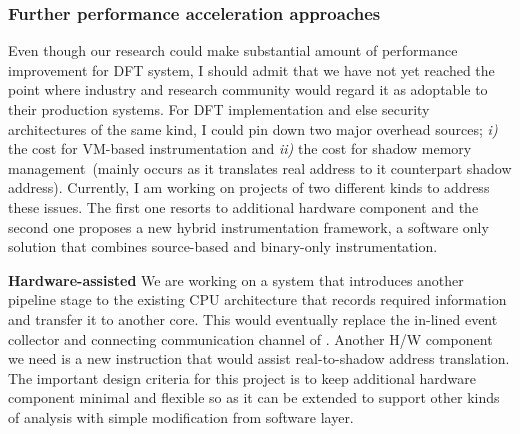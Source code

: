 \documentclass[letterpaper, 10pt]{article}
\begin{document}
\begin{small}
\subsubsection*{Further performance acceleration approaches}
%
Even though our research could make substantial amount of performance
improvement for DFT system, I should admit that we have not yet reached the
point where industry and research community would regard it as adoptable to
their production systems.
%
For DFT implementation and else security architectures of the same kind, I
could pin down two major overhead sources; {\it i)} the cost for VM-based
instrumentation and {\it ii)} the cost for shadow memory management~(mainly
occurs as it translates real address to it counterpart shadow address).
%
Currently, I am working on projects of two different kinds to address these
issues. The first one resorts to additional hardware component and the second
one proposes a new hybrid instrumentation framework, a software only solution
that combines source-based and binary-only instrumentation.

{\bf Hardware-assisted \SR} 
%
%
We are working on a system that introduces another pipeline stage to the
existing CPU architecture that records required information and transfer it to
another core. This would eventually replace the in-lined event collector and
connecting communication channel of \SR. Another H/W component we need is a new
instruction that would assist real-to-shadow address translation. The important
design criteria for this project is to keep additional hardware component
minimal and flexible so as it can be extended to support other kinds of
analysis with simple modification from software layer.
 

\end{small}
\end{document}
